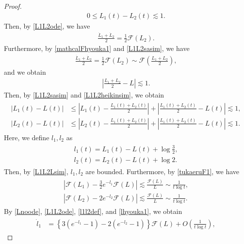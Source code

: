 \documentclass[10pt,a4paper]{amsart}
\numberwithin{equation}{section}
\begin{document}
\begin{proof}
\begin{align}
0\leq L_1(t)-L_2(t)\lesssim 1.
\end{align}
Then, by \eqref{L1L2ode}, we have
\begin{align*}
\frac{\dot{L}_1+\dot{L}_2}{2}=\frac{1}{2}\mathcal{F}(L_2).
\end{align*}
Furthermore, by \eqref{mathcalFhyouka1} and \eqref{L1L2sasim}, we have
\begin{align*}
\frac{\dot{L}_1+\dot{L}_2}{2}=\frac{1}{2}\mathcal{F}(L_2)\sim \mathcal{F}\left(\frac{L_1+L_2}{2}\right),
\end{align*}
and we obtain
\begin{align}\label{L1L2heikinsim}
\left|\frac{L_1+L_2}{2}-L\right|\lesssim 1.
\end{align}
Then, by \eqref{L1L2sasim} and \eqref{L1L2heikinsim}, we obtain
\begin{align}\label{L1L2Lsim}
\begin{aligned}
|L_1(t)-L(t)|&\leq \left|L_1(t)-\frac{L_1(t)+L_2(t)}{2}\right|+\left|\frac{L_1(t)+L_2(t)}{2}-L(t)\right|\lesssim 1,
\\
|L_2(t)-L(t)|&\leq \left|L_2(t)-\frac{L_1(t)+L_2(t)}{2}\right|+\left|\frac{L_1(t)+L_2(t)}{2}-L(t)\right|\lesssim 1.
\end{aligned}
\end{align}
Here, we define $l_1,l_2$ as 
\begin{align}\label{l1l2def}
\begin{aligned}
l_1(t)=L_1(t)-L(t)+\log{\frac{3}{2}},
\\
l_2(t)=L_2(t)-L(t)+\log{2}.
\end{aligned}
\end{align}
Then, by \eqref{L1L2Lsim}, $l_1,l_2$ are bounded. Furthermore, by \eqref{tukaeruF1}, we have
\begin{align}\label{lhyouka1}
\begin{aligned}
\left|\mathcal{F}(L_1)-\frac{3}{2}e^{-l_1}\mathcal{F}(L)\right|\lesssim \frac{\mathcal{F}(L)}{L}\sim \frac{1}{t\log{t}},
\\
\left|\mathcal{F}(L_2)-2e^{-l_2}\mathcal{F}(L)\right|\lesssim \frac{\mathcal{F}(L)}{L}\sim \frac{1}{t\log{t}}.
\end{aligned}
\end{align}
By \eqref{Lnoode}, \eqref{L1L2ode}, \eqref{l1l2def}, and \eqref{lhyouka1}, we obtain
\begin{align}\label{LinoLyapunov1}
\begin{aligned}
\dot{l}_1&=\left\{3\left(e^{-l_1}-1\right)-2\left(e^{-l_2}-1\right)\right\}\mathcal{F}(L)+O\left(\frac{1}{t\log{t}}\right),

\end{aligned}
\end{align}
\end{proof}
\end{document}
